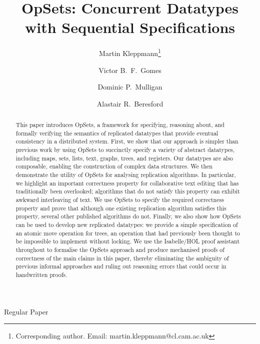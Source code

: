 \documentclass[11pt]{article}
\begin{document}
\sloppy
\title{OpSets: Concurrent Datatypes with Sequential Specifications}
\author[1]{Martin Kleppmann\thanks{Corresponding author. Email: martin.kleppmann@cl.cam.ac.uk}}
\author[1]{Victor B.\ F.\ Gomes}
\author[2]{Dominic P.\ Mulligan}
\author[1]{Alastair R.\ Beresford}
\date{}


\maketitle

\begin{center}
Regular Paper
\end{center}

\begin{abstract}
This paper introduces OpSets, a framework for specifying, reasoning about, and formally verifying the semantics of replicated datatypes that provide eventual consistency in a distributed system.
First, we show that our approach is simpler than previous work by using OpSets to succinctly specify a variety of abstract datatypes, including maps, sets, lists, text, graphs, trees, and registers.
Our datatypes are also composable, enabling the construction of complex data structures.
We then demonstrate the utility of OpSets for analysing replication algorithms.
In particular, we highlight an important correctness property for collaborative text editing that has traditionally been overlooked; algorithms that do not satisfy this property can exhibit awkward interleaving of text.
We use OpSets to specify the required correctness property and prove that although one existing replication algorithm satisfies this property, several other published algorithms do not.
Finally, we also show how OpSets can be used to develop new replicated datatypes: we provide a simple specification of an atomic move operation for trees, an operation that had previously been thought to be impossible to implement without locking.
We use the Isabelle/HOL proof assistant throughout to formalise the OpSets approach and produce mechanised proofs of correctness of the main claims in this paper, thereby eliminating the ambiguity of previous informal approaches and ruling out reasoning errors that could occur in handwritten proofs.
\end{abstract}
\clearpage
\end{document}
